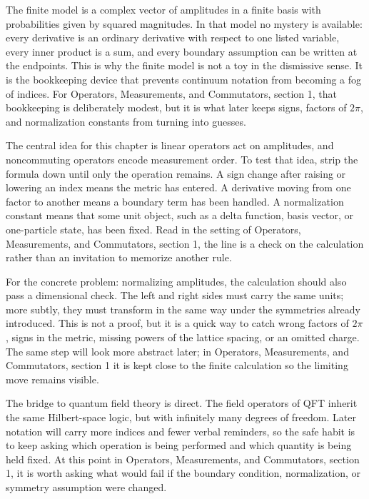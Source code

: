 The finite model is a complex vector of amplitudes in a finite basis with probabilities given by squared magnitudes.  In that model no mystery is available: every derivative is an ordinary derivative with respect to one listed variable, every inner product is a sum, and every boundary assumption can be written at the endpoints.  This is why the finite model is not a toy in the dismissive sense.  It is the bookkeeping device that prevents continuum notation from becoming a fog of indices.  For Operators, Measurements, and Commutators, section 1, that bookkeeping is deliberately modest, but it is what later keeps signs, factors of \(2\pi\), and normalization constants from turning into guesses.

The central idea for this chapter is linear operators act on amplitudes, and noncommuting operators encode measurement order.  To test that idea, strip the formula down until only the operation remains.  A sign change after raising or lowering an index means the metric has entered.  A derivative moving from one factor to another means a boundary term has been handled.  A normalization constant means that some unit object, such as a delta function, basis vector, or one-particle state, has been fixed.  Read in the setting of Operators, Measurements, and Commutators, section 1, the line is a check on the calculation rather than an invitation to memorize another rule.

For the concrete problem: normalizing amplitudes, the calculation should also pass a dimensional check.  The left and right sides must carry the same units; more subtly, they must transform in the same way under the symmetries already introduced.  This is not a proof, but it is a quick way to catch wrong factors of \(2\pi\), signs in the metric, missing powers of the lattice spacing, or an omitted charge.  The same step will look more abstract later; in Operators, Measurements, and Commutators, section 1 it is kept close to the finite calculation so the limiting move remains visible.

The bridge to quantum field theory is direct.  The field operators of QFT inherit the same Hilbert-space logic, but with infinitely many degrees of freedom.  Later notation will carry more indices and fewer verbal reminders, so the safe habit is to keep asking which operation is being performed and which quantity is being held fixed.  At this point in Operators, Measurements, and Commutators, section 1, it is worth asking what would fail if the boundary condition, normalization, or symmetry assumption were changed.


